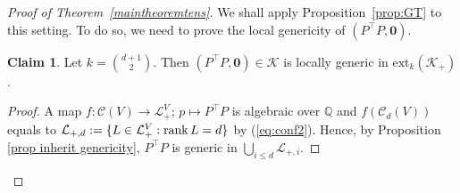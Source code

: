 \documentclass[11pt]{article}
\theoremstyle{definition}
\newtheorem{claim}[defi]{Claim}
\begin{document}
\begin{proof}[Proof of Theorem~\ref{maintheoremtens}]
 We shall apply Proposition~\ref{prop:GT} to this setting.
 To do so, we need to prove the local genericity of $(P^{\top}P, {\bm 0})$. 
% 
    \begin{claim} \label{claim:tensegrity}
        Let $k=\binom{d+1}{2}$.
        Then $(P^\top P,\bm{0})\in \mathcal{K}$ is locally generic in $\text{ext}_k(\mathcal{K}_+)$.
    \end{claim}
    \begin{proof}
        A map $f: \mathcal{C}(V) \rightarrow \mathcal{L}^V_+$; $p \mapsto P^\top P$ is algebraic over $\mathbb{Q}$ and
        $f(\mathcal{C}_d(V) )$ equals to $\mathcal{L}_{+,d}:=\{L\in \mathcal{L}^V_+: \rank L=d\}$ by (\ref{eq:conf2}).
        Hence, by Proposition \ref{prop inherit genericity}, $P^\top P$ is generic in $\bigcup_{i\leq d} \mathcal{L}_{+,i}$.
%        

	
        

\end{proof}
\end{proof}
\end{document}
